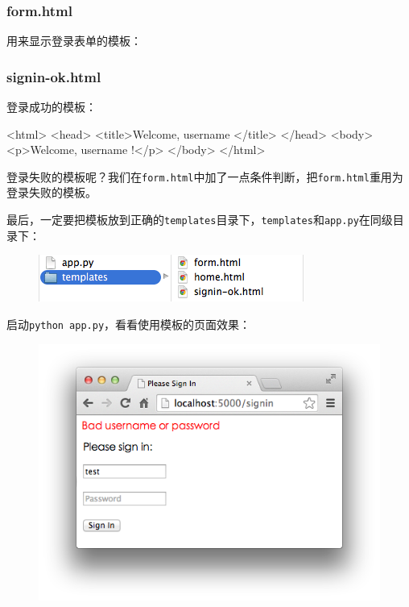\hypertarget{form.html}{%
\subsubsection{form.html}\label{form.html}}

用来显示登录表单的模板：


\hypertarget{signin-ok.html}{%
\subsubsection{signin-ok.html}\label{signin-ok.html}}

登录成功的模板：

\begin{pythoncode}
<html>
<head>
  <title>Welcome, {{ username }}</title>
</head>
<body>
  <p>Welcome, {{ username }}!</p>
</body>
</html>
\end{pythoncode}

登录失败的模板呢？我们在\texttt{form.html}中加了一点条件判断，把\texttt{form.html}重用为登录失败的模板。

最后，一定要把模板放到正确的\texttt{templates}目录下，\texttt{templates}和\texttt{app.py}在同级目录下：

 
 \begin{figure}[htp]
	\centering
	\includegraphics[width=0.6\linewidth]{fig/951386163120736.png}
\end{figure}


启动\texttt{python\ app.py}，看看使用模板的页面效果：

 
 \begin{figure}[htp]
	\centering
	\includegraphics[width=0.6\linewidth]{fig/951385556253728.png}
\end{figure}


